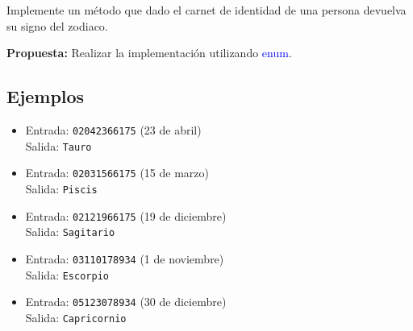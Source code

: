 Implemente un método que dado el carnet de identidad de una persona devuelva su signo del zodiaco.

\textbf{Propuesta:} Realizar la implementación utilizando \textcolor{blue}{enum}.

\subsection*{Ejemplos}
\begin{itemize}
    \item Entrada: \texttt{02042366175} (23 de abril)\\
          Salida: \texttt{Tauro}
    \item Entrada: \texttt{02031566175} (15 de marzo)\\
          Salida: \texttt{Piscis}
    \item Entrada: \texttt{02121966175} (19 de diciembre)\\
          Salida: \texttt{Sagitario}
    \item Entrada: \texttt{03110178934} (1 de noviembre)\\
          Salida: \texttt{Escorpio}
    \item Entrada: \texttt{05123078934} (30 de diciembre)\\
          Salida: \texttt{Capricornio}
\end{itemize}

